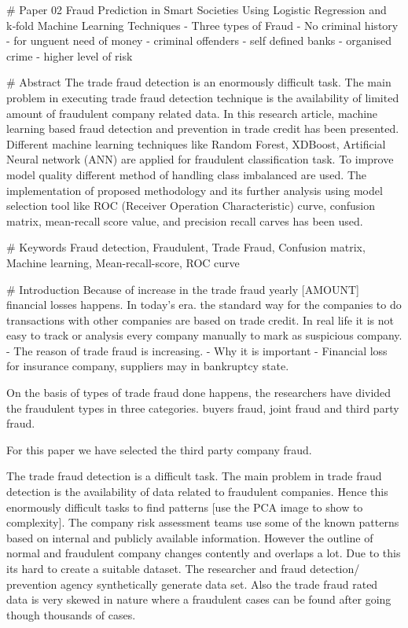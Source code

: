 # Paper 02
Fraud Prediction in Smart Societies Using Logistic Regression and k‑fold Machine Learning Techniques
- Three types of Fraud 
    - No criminal history - for unguent need of money
    - criminal offenders - self defined banks 
    - organised crime - higher level of risk 


# Abstract
The trade fraud detection is an enormously difficult task. The main problem in executing trade fraud detection technique is the availability of limited amount of fraudulent company related data. In this research article, machine learning based fraud detection and prevention in trade credit has been presented. Different machine learning techniques like Random Forest, XDBoost, Artificial Neural network (ANN) are applied for fraudulent classification task. To improve model quality different method of handling class imbalanced are used. The implementation of proposed methodology and its further analysis using model selection tool like ROC (Receiver Operation Characteristic) curve, confusion matrix, mean-recall score value, and precision recall carves has been used. 

# Keywords
Fraud detection, Fraudulent, Trade Fraud, Confusion matrix, Machine learning, Mean-recall-score, ROC curve


# Introduction 
Because of increase in the trade fraud yearly [AMOUNT] financial losses happens. In today's era. the standard way for the companies to do transactions with other companies are based on trade credit. In real life it is not easy to track or analysis every company manually to mark as suspicious company. 
- The reason of trade fraud is increasing. 
- Why it is important - Financial loss for insurance company, suppliers may in bankruptcy state.


On the basis of types of trade fraud done happens, the researchers have divided the fraudulent types in three categories. buyers fraud, joint fraud and third party fraud. 

For this paper we have selected the third party company fraud. 

The trade fraud detection is a difficult task. The main problem in trade fraud detection is the availability of data related to fraudulent companies. Hence this enormously difficult tasks to find patterns [use the PCA image to show to complexity]. The company risk assessment teams use some of the known patterns based on internal and publicly available information. However the outline of normal and fraudulent company changes contently and overlaps a lot. Due to this its hard to create a suitable dataset. The researcher and fraud detection/ prevention agency synthetically generate data set. Also the trade fraud rated data is very skewed in nature where a fraudulent cases can be found after going though thousands of cases. 

